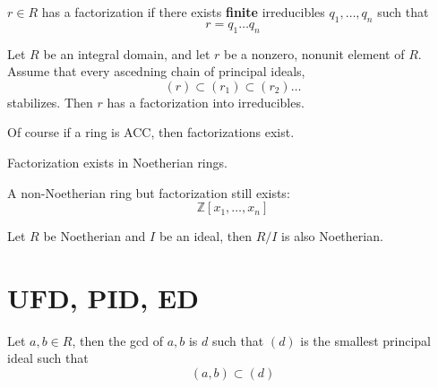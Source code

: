 \documentclass[openany]{book}
\newcommand{\Z}{\mathbb{Z}}
\begin{document}
\begin{defn}[factorization]
    $r\in R$ has a factorization if there exists \textbf{finite} irreducibles $q_1,\dots, q_n$ such that 
    \begin{equation*}
        r=q_1\dots q_n
    \end{equation*}
\end{defn}









\begin{prop}
    
    Let $R$ be an integral domain, and let $r$ be a nonzero, nonunit element of $R$. Assume that every ascedning chain of principal ideals, 
    \begin{equation*}
        (r)\subset (r_1)\subset (r_2)\dots
    \end{equation*}
    stabilizes. Then $r$ has a factorization into irreducibles.
\end{prop}
Of course if a ring is ACC, then factorizations exist.



\begin{prop}
    Factorization exists in Noetherian rings.

\end{prop}


\begin{example}  
    A non-Noetherian ring but factorization still exists:
    \begin{equation*}
        \Z[x_1,\dots,x_n]
    \end{equation*}
\end{example}

\begin{prop}
    Let $R$ be Noetherian and $I$ be an ideal, then $R/I$ is also Noetherian.
\end{prop}

\section{UFD, PID, ED}
\begin{defn}[gcd]
    Let $a,b\in R$, then the gcd of $a,b$ is $d$ such that $(d)$ is the smallest principal ideal such that 
    \begin{equation*}
        (a,b)\subset (d)
    \end{equation*}
\end{defn}
\end{document}
